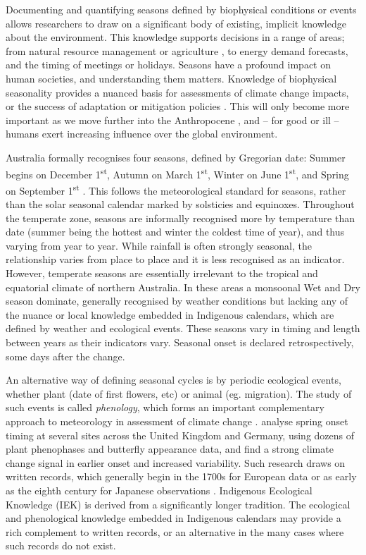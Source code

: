 Documenting and quantifying seasons defined by biophysical conditions
or events allows researchers to draw on a significant body of existing,
implicit knowledge about the environment.
%
This knowledge supports decisions in a range of areas; from natural
resource management or agriculture \citep{woodward2012a,ens2012}, to
energy demand forecasts, and the timing of meetings or holidays.
Seasons have a profound impact on human societies, and understanding
them matters.  Knowledge of biophysical seasonality provides a nuanced
basis for assessments of climate change impacts, or the success of
adaptation or mitigation policies \citep{green2010a,stevenson1996,prober2011}.
This will only become more important as we move further into the Anthropocene
\citep{steffen2007}, and -- for good or ill -- humans exert increasing
influence over the global environment.


Australia formally recognises four seasons, defined by Gregorian date:
Summer begins on December 1\textsuperscript{st}, Autumn on March
1\textsuperscript{st}, Winter on June 1\textsuperscript{st}, and Spring
on September 1\textsuperscript{st} \citep{wells2013}. This follows the
meteorological standard for seasons, rather
than the solar seasonal calendar marked by solsticies and equinoxes.
%
Throughout the temperate zone, seasons are informally recognised more by
temperature than date (summer being the hottest and winter the coldest time
of year), and thus varying from year to year.  While rainfall is often
strongly seasonal, the relationship varies from place to place and it is
less recognised as an indicator.
%
However, temperate seasons are essentially irrelevant to the tropical and
equatorial climate of northern Australia.  In these areas a monsoonal Wet
and Dry season dominate, generally recognised by weather conditions
but lacking any of the nuance or local knowledge embedded in Indigenous
calendars, which are defined by weather and ecological events.  These
seasons vary in timing and length between years as their indicators vary.
Seasonal onset is declared retrospectively, some days after the change.


An alternative way of defining seasonal cycles is by periodic ecological
events, whether plant (date of first flowers, etc) or animal (eg. migration).
The study of such events is called \textit{phenology}, which forms an
important complementary approach to meteorology in assessment of climate
change \citep[eg.][]{roy2000}.  \citet{menzel2006} analyse spring onset timing
at several sites across the United Kingdom and Germany, using dozens of
plant phenophases and butterfly appearance data, and find a strong climate
change signal in earlier onset and increased variability.  Such research
draws on written records, which generally begin in the 1700s for European
data or as early as the eighth century for Japanese observations \citep{sparks2002}.
%
Indigenous Ecological Knowledge (IEK) is derived from a significantly longer
tradition.  The ecological and phenological knowledge embedded
in Indigenous calendars may provide a rich complement to written records,
or an alternative in the many cases where such records do not exist.

